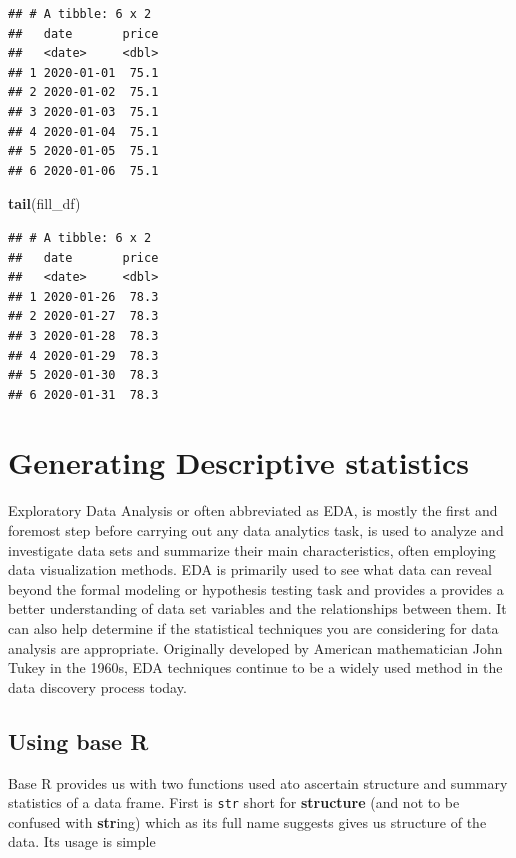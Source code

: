 \documentclass[
]{book}
\newenvironment{Shaded}{\begin{snugshade}}{\end{snugshade}}
\newcommand{\FunctionTok}[1]{\textcolor[rgb]{0.13,0.29,0.53}{\textbf{#1}}}
\newcommand{\NormalTok}[1]{#1}
\begin{document}
\begin{verbatim}
## # A tibble: 6 x 2
##   date       price
##   <date>     <dbl>
## 1 2020-01-01  75.1
## 2 2020-01-02  75.1
## 3 2020-01-03  75.1
## 4 2020-01-04  75.1
## 5 2020-01-05  75.1
## 6 2020-01-06  75.1
\end{verbatim}

\begin{Shaded}
\begin{Highlighting}[]
\FunctionTok{tail}\NormalTok{(fill\_df)}
\end{Highlighting}
\end{Shaded}

\begin{verbatim}
## # A tibble: 6 x 2
##   date       price
##   <date>     <dbl>
## 1 2020-01-26  78.3
## 2 2020-01-27  78.3
## 3 2020-01-28  78.3
## 4 2020-01-29  78.3
## 5 2020-01-30  78.3
## 6 2020-01-31  78.3
\end{verbatim}

\hypertarget{generating-descriptive-statistics}{%
\chapter{Generating Descriptive statistics}\label{generating-descriptive-statistics}}

Exploratory Data Analysis or often abbreviated as EDA, is mostly the first and foremost step before carrying out any data analytics task, is used to analyze and investigate data sets and summarize their main characteristics, often employing data visualization methods. EDA is primarily used to see what data can reveal beyond the formal modeling or hypothesis testing task and provides a provides a better understanding of data set variables and the relationships between them. It can also help determine if the statistical techniques you are considering for data analysis are appropriate. Originally developed by American mathematician John Tukey in the 1960s, EDA techniques continue to be a widely used method in the data discovery process today.

\hypertarget{using-base-r}{%
\section{Using base R}\label{using-base-r}}

Base R provides us with two functions used ato ascertain structure and summary statistics of a data frame. First is \texttt{str} short for \textbf{structure} (and not to be confused with \textbf{str}ing) which as its full name suggests gives us structure of the data. Its usage is simple
\end{document}
